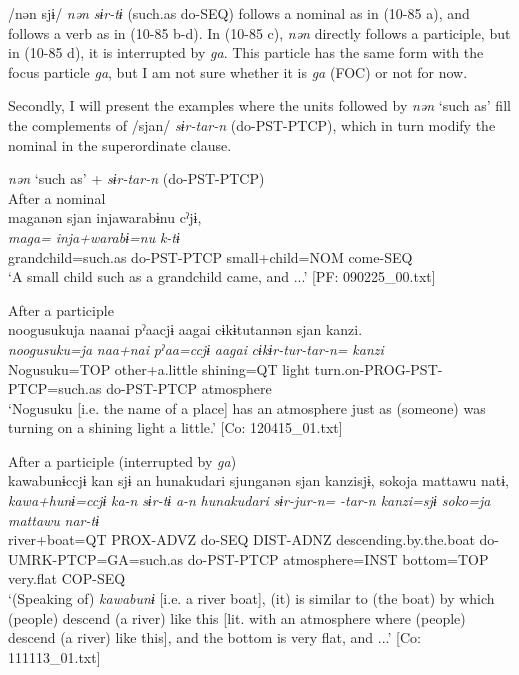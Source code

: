 /nən sjɨ/ \textit{nən} \textit{sɨr-tɨ} (such.as do-SEQ) follows a nominal as in (10-85 a), and follows a verb as in (10-85 b-d). In (10-85 c), \textit{nən} directly follows a participle, but in (10-85 d), it is interrupted by \textit{ga}. This particle has the same form with the focus particle \textit{ga}, but I am not sure whether it is \textit{ga} (FOC) or not for now.

  Secondly, I will present the examples where the units followed by \textit{nən} ‘such as’ fill the complements of /sjan/ \textit{sɨr-tar-n} (do-PST-PTCP), which in turn modify the nominal in the superordinate clause.

\ea\label{ex:10.86}   \textit{nən} ‘such as’ + \textit{sɨr-tar-n} (do-PST-PTCP)\\
  \ea After a nominal\\
      \glll    maganən  sjan  injawarabɨnu  cˀjɨ,\\
    \textit{maga=}  \textit{}  \textit{inja+warabɨ=nu}  \textit{k-tɨ}\\
    grandchild=such.as  do-PST-PTCP  small+child=NOM  come-SEQ\\
    \glt     ‘A small child such as a grandchild came, and ...’ [PF: 090225\_00.txt]

  \ex After a participle\\

      \glll    noogusukuja  naanai  pˀaacjɨ  aagai  cɨkɨtutannən  sjan  {\textbar}kanzi{\textbar}.\\
    \textit{noogusuku=ja}  \textit{naa+nai}  \textit{pˀaa=ccjɨ}  \textit{aagai}  \textit{cɨkɨr-tur-tar-n=}  \textit{}  \textit{kanzi}\\
    Nogusuku=TOP  other+a.little  shining=QT  light turn.on-PROG-PST-PTCP=such.as  do-PST-PTCP  atmosphere\\
\glt     ‘Nogusuku [i.e. the name of a place] has an atmosphere just as (someone) was turning on a shining light a little.’  [Co: 120415\_01.txt]

  \ex After a participle (interrupted by \textit{ga})\\

      \glll    {\textbar}kawa{\textbar}bunɨccjɨ  kan  sjɨ  an  {\textbar}hunakudari{\textbar}  sjunganən  sjan  {\textbar}kanzi{\textbar}sjɨ,  {\textbar}soko{\textbar}ja   mattawu  natɨ,\\
    \textit{kawa+hunɨ=ccjɨ}  \textit{ka-n}  \textit{sɨr-tɨ}  \textit{a-n}  \textit{hunakudari}  \textit{sɨr-jur-n=}  \textit{-tar-n  kanzi=sjɨ  soko=ja}  \textit{mattawu}  \textit{nar-tɨ}\\
    river+boat=QT  PROX-ADVZ  do-SEQ  DIST-ADNZ  descending.by.the.boat do-UMRK-PTCP=GA=such.as  do-PST-PTCP  atmosphere=INST  bottom=TOP  very.flat  COP-SEQ    \\
    \glt     ‘(Speaking of) \textit{kawabunɨ} [i.e. a river boat], (it) is similar to (the boat) by which (people) descend (a river) like this [lit. with an atmosphere where (people) descend (a river) like this], and the bottom is very flat, and ...’  [Co: 111113\_01.txt]
    \z
\z

